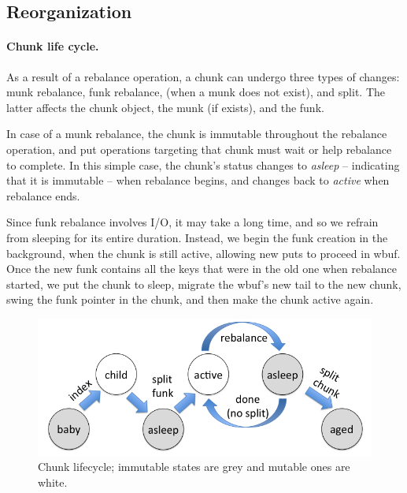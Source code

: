 \subsection{Reorganization}
\label{ssec:rebalance}


\paragraph{Chunk life cycle.}

As a result of a rebalance operation, a chunk can undergo three types of changes: munk rebalance, funk rebalance,
(when a munk does not exist), and split. The latter affects the chunk object, the munk (if exists), and the funk.

In case of a munk rebalance, the chunk is immutable throughout the rebalance operation, and put operations targeting that chunk must
wait or help rebalance to complete. In this simple case, the chunk's status changes to \emph{asleep} -- indicating that it is immutable -- 
when rebalance begins, and changes back to \emph{active} when rebalance ends. 

Since funk rebalance involves I/O, it may take a long time, and so we  refrain from sleeping for its entire 
duration. Instead, we begin the funk creation in the background, when the chunk is still active, 
allowing new puts to proceed in wbuf. Once the new funk contains all the keys that were in the old one when 
rebalance started, we put the chunk to sleep,  
migrate the wbuf's new tail to the new chunk, swing the funk pointer in the chunk, and then make the chunk active again.


\begin{figure}[htb]
\centerline{
\includegraphics[width=\columnwidth]{state-diagram.png}
}
\caption{Chunk lifecycle; immutable states are grey and mutable ones are white.}
\label{fig:status}
\end{figure}

